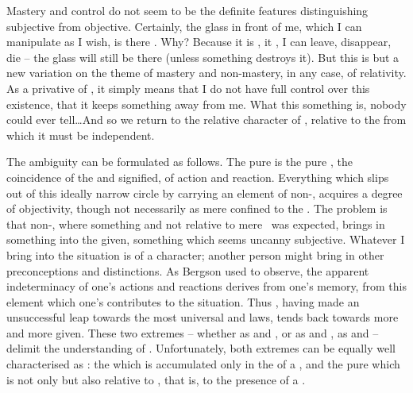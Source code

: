 Mastery and control do not seem to be the definite features distinguishing
{subjective} from {objective}.  Certainly, the glass in front of me, which I can
manipulate as I wish, is there .  Why?  Because it is
, it , I can leave, disappear,
die -- the glass will still be there (unless something destroys it).  But this
 is but a new variation on the theme of mastery and
non-mastery, in any case, of relativity.  As a privative of , it
simply means that I do not have full control over this existence, that it keeps
something away from me. What this something is, nobody could ever tell\ldots And so we return
to the relative character of , relative to the 
from which it must be independent.

\pa The ambiguity can be formulated as follows.  The pure  is
the pure , the coincidence of the  and signified, of
action and reaction. Everything which slips out of this ideally narrow circle by
carrying an element of non-, acquires a degree of {objectivity},
though not necessarily  as mere  confined to the
\hoa. The problem is that non-, where something 
and not relative to mere \herenow\ was expected, brings in something into the
 given, something which seems uncanny subjective. Whatever I bring
into the  situation is of a  character; another
person might bring in other preconceptions and distinctions. As Bergson used to
observe, the apparent indeterminacy of one's actions and reactions derives from
one's memory, from this  element which one's 
contributes to the  situation.  Thus , having made
an unsuccessful leap towards the most universal and  laws, tends
back towards more and more  given. These two extremes -- whether as
 and , or as  and ,
as  and  -- delimit the understanding of
.  Unfortunately, both extremes can be equally well
characterised as : the  which is accumulated
only in the  of a , and the pure  which is
not only  but also relative to \herenow, that is, to the presence
of a .

